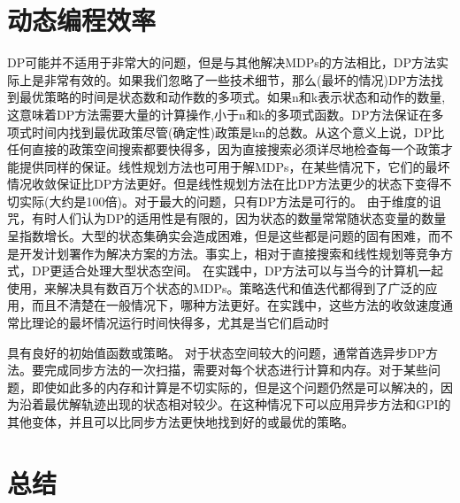 \section{动态编程效率}

DP可能并不适用于非常大的问题，但是与其他解决MDPs的方法相比，DP方法实际上是非常有效的。如果我们忽略了一些技术细节，那么(最坏的情况)DP方法找到最优策略的时间是状态数和动作数的多项式。如果n和k表示状态和动作的数量,这意味着DP方法需要大量的计算操作,小于n和k的多项式函数。DP方法保证在多项式时间内找到最优政策尽管(确定性)政策是kn的总数。从这个意义上说，DP比任何直接的政策空间搜索都要快得多，因为直接搜索必须详尽地检查每一个政策才能提供同样的保证。线性规划方法也可用于解MDPs，在某些情况下，它们的最坏情况收敛保证比DP方法更好。但是线性规划方法在比DP方法更少的状态下变得不切实际(大约是100倍)。对于最大的问题，只有DP方法是可行的。
由于维度的诅咒，有时人们认为DP的适用性是有限的，因为状态的数量常常随状态变量的数量呈指数增长。大型的状态集确实会造成困难，但是这些都是问题的固有困难，而不是开发计划署作为解决方案的方法。事实上，相对于直接搜索和线性规划等竞争方式，DP更适合处理大型状态空间。
在实践中，DP方法可以与当今的计算机一起使用，来解决具有数百万个状态的MDPs。策略迭代和值迭代都得到了广泛的应用，而且不清楚在一般情况下，哪种方法更好。在实践中，这些方法的收敛速度通常比理论的最坏情况运行时间快得多，尤其是当它们启动时

具有良好的初始值函数或策略。
对于状态空间较大的问题，通常首选异步DP方法。要完成同步方法的一次扫描，需要对每个状态进行计算和内存。对于某些问题，即使如此多的内存和计算是不切实际的，但是这个问题仍然是可以解决的，因为沿着最优解轨迹出现的状态相对较少。在这种情况下可以应用异步方法和GPI的其他变体，并且可以比同步方法更快地找到好的或最优的策略。


\section{总结}

